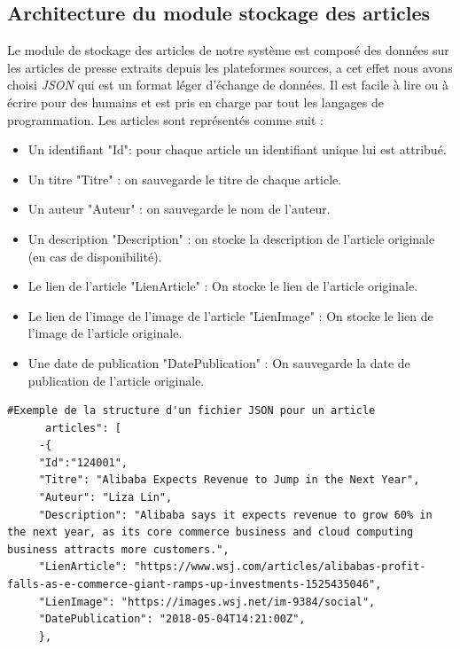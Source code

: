 \subsection{Architecture du module stockage des articles}
Le module de stockage des articles de notre système est composé des données sur les articles de presse extraits depuis les plateformes sources, a cet effet nous avons choisi \emph{JSON} qui est un format léger d'échange de données. Il est facile à lire ou à écrire pour des humains\cite{json} et est pris en charge par tout les langages de programmation. Les articles sont représentés comme suit :

   \begin{itemize}
    
     \item Un identifiant "Id": pour chaque article un identifiant unique lui est attribué.\\
     
     \item Un titre "Titre" : on sauvegarde le titre de chaque article.\\
     
     \item Un auteur "Auteur" : on sauvegarde le nom de l'auteur.\\
     
     \item Un description "Description" : on stocke la description de l'article originale (en cas de disponibilité).\\
     
     \item Le lien de l'article "LienArticle" : On stocke le lien de l'article originale.\\
     
     \item Le lien de l'image de l'image de l'article "LienImage" : On stocke le lien de l'image de l'article originale.\\
     
     \item Une date de publication "DatePublication" : On sauvegarde la date de publication de l'article originale.\\
     
    \end{itemize}

     \begin{lstlisting}[style=code]
      #Exemple de la structure d'un fichier JSON pour un article
      articles": [
     -{
     "Id":"124001",
     "Titre": "Alibaba Expects Revenue to Jump in the Next Year",
     "Auteur": "Liza Lin",
     "Description": "Alibaba says it expects revenue to grow 60% in the next year, as its core commerce business and cloud computing business attracts more customers.",
     "LienArticle": "https://www.wsj.com/articles/alibabas-profit-falls-as-e-commerce-giant-ramps-up-investments-1525435046",
     "LienImage": "https://images.wsj.net/im-9384/social",
     "DatePublication": "2018-05-04T14:21:00Z",
     },
     
     \end{lstlisting}
    
